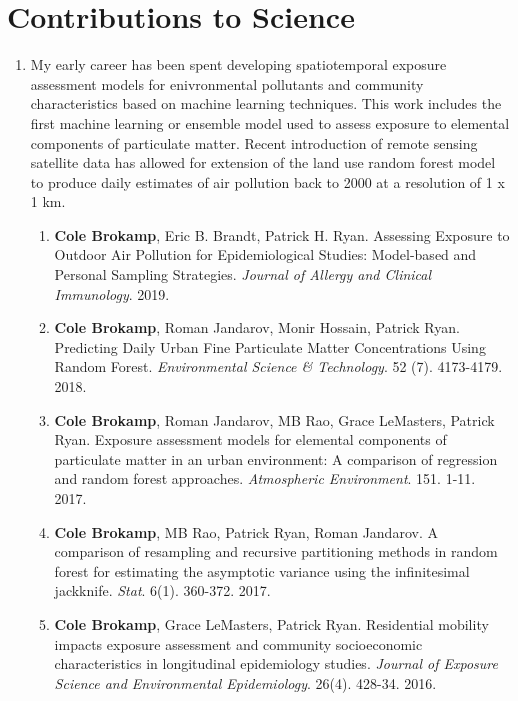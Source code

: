 \documentclass{nihbiosketch}
\begin{document}

\section{Contributions to Science}

\begin{enumerate}

\item My early career has been spent developing spatiotemporal exposure assessment models for
  enivronmental pollutants and community characteristics based on machine learning
  techniques.  This work includes the first machine
  learning or ensemble model used to assess exposure to elemental components of
  particulate matter. Recent introduction of remote sensing satellite data has
  allowed for extension of the land use random forest model to produce daily
  estimates of air pollution back to 2000 at a resolution of 1 x 1 km.

\begin{enumerate}
	
  \item \textbf{Cole Brokamp}, Eric B. Brandt, Patrick H. Ryan. Assessing
  Exposure to Outdoor Air Pollution for Epidemiological Studies:
  Model-based and Personal Sampling Strategies. \emph{Journal of Allergy
    and Clinical Immunology}. 2019.

	\item \textbf{Cole Brokamp}, Roman Jandarov, Monir Hossain, Patrick Ryan. Predicting Daily Urban Fine Particulate Matter Concentrations Using Random Forest. \textit{Environmental Science \& Technology}. 52 (7). 4173-4179. 2018.

	\item \textbf{Cole Brokamp}, Roman Jandarov, MB Rao, Grace LeMasters, Patrick Ryan. Exposure assessment models for elemental components of particulate matter in an urban environment: A comparison of regression and random forest approaches. \textit{Atmospheric Environment}. 151. 1-11. 2017.
	
	\item \textbf{Cole Brokamp}, MB Rao, Patrick Ryan, Roman Jandarov. A comparison of resampling and recursive partitioning methods in random forest for estimating the asymptotic variance using the infinitesimal jackknife. \textit{Stat}. 6(1). 360-372. 2017.

  \item \textbf{Cole Brokamp}, Grace LeMasters, Patrick Ryan. Residential
    mobility impacts exposure assessment and community socioeconomic
    characteristics in longitudinal epidemiology studies. \emph{Journal of
      Exposure Science and Environmental Epidemiology}. 26(4). 428-34. 2016.


\end{enumerate}
\end{enumerate}
\end{document}
